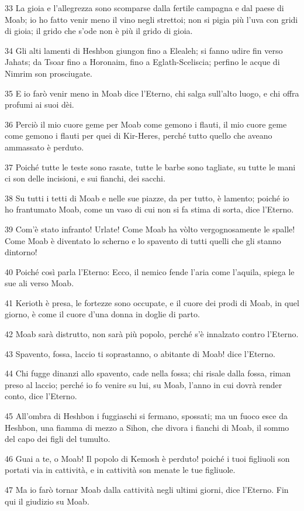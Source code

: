 \par 33 La gioia e l'allegrezza sono scomparse dalla fertile campagna e dal paese di Moab; io ho fatto venir meno il vino negli strettoi; non si pigia più l'uva con gridi di gioia; il grido che s'ode non è più il grido di gioia.
\par 34 Gli alti lamenti di Heshbon giungon fino a Elealeh; si fanno udire fin verso Jahats; da Tsoar fino a Horonaim, fino a Eglath-Sceliscia; perfino le acque di Nimrim son prosciugate.
\par 35 E io farò venir meno in Moab dice l'Eterno, chi salga sull'alto luogo, e chi offra profumi ai suoi dèi.
\par 36 Perciò il mio cuore geme per Moab come gemono i flauti, il mio cuore geme come gemono i flauti per quei di Kir-Heres, perché tutto quello che aveano ammassato è perduto.
\par 37 Poiché tutte le teste sono rasate, tutte le barbe sono tagliate, su tutte le mani ci son delle incisioni, e sui fianchi, dei sacchi.
\par 38 Su tutti i tetti di Moab e nelle sue piazze, da per tutto, è lamento; poiché io ho frantumato Moab, come un vaso di cui non si fa stima di sorta, dice l'Eterno.
\par 39 Com'è stato infranto! Urlate! Come Moab ha vòlto vergognosamente le spalle! Come Moab è diventato lo scherno e lo spavento di tutti quelli che gli stanno dintorno!
\par 40 Poiché così parla l'Eterno: Ecco, il nemico fende l'aria come l'aquila, spiega le sue ali verso Moab.
\par 41 Kerioth è presa, le fortezze sono occupate, e il cuore dei prodi di Moab, in quel giorno, è come il cuore d'una donna in doglie di parto.
\par 42 Moab sarà distrutto, non sarà più popolo, perché s'è innalzato contro l'Eterno.
\par 43 Spavento, fossa, laccio ti soprastanno, o abitante di Moab! dice l'Eterno.
\par 44 Chi fugge dinanzi allo spavento, cade nella fossa; chi risale dalla fossa, riman preso al laccio; perché io fo venire su lui, su Moab, l'anno in cui dovrà render conto, dice l'Eterno.
\par 45 All'ombra di Heshbon i fuggiaschi si fermano, spossati; ma un fuoco esce da Heshbon, una fiamma di mezzo a Sihon, che divora i fianchi di Moab, il sommo del capo dei figli del tumulto.
\par 46 Guai a te, o Moab! Il popolo di Kemosh è perduto! poiché i tuoi figliuoli son portati via in cattività, e in cattività son menate le tue figliuole.
\par 47 Ma io farò tornar Moab dalla cattività negli ultimi giorni, dice l'Eterno. Fin qui il giudizio su Moab.

